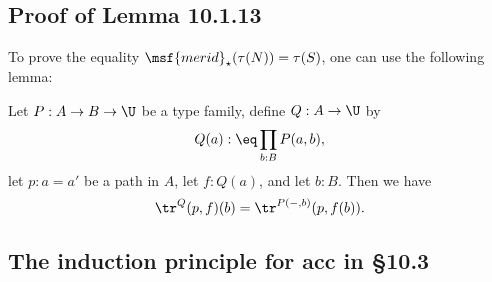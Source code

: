 \documentclass[12pt]{article}
\begin{document}
\begin{comment}

This is about the sentence ``The obvious candidate for the coequalizer of the kernel pair of $f:A\to B$ is the image of f, as defined in \S7.6'' a few paragraphs before Lemma 10.1.1. (It's clear from the context that $A$ and $B$ are sets.) Let's show that this obvious candidate is the good one. It suffices to prove the statement

Let $A$ and $B$ be sets, let $f:A\to B$ be a surjection, define the equivalence relation $\sim$ on $A$ by 
$$
a\sim a'\text{ if and only if }f(a)=f(a'),
$$
let $A/\!\!\sim$ be the quotient as defined at the beginning of \S6.10, and let $q:A\to A/\!\!\sim$ be the canonical projection. Then there is a map $g:B\to A/\!\!\sim$ such that $g\ci f=q$:
$$
\xymatrix{
&A\ar[dl]_f\ar[dr]^q\\
B\ar[rr]_g&&A/\!\!\sim.
}
$$ 

Proof. Given $b:B$ we define the sets and maps 
$$
\xymatrix{
\fib_f(b)\ar[rr]^{\pr_1}\ar[d]_{\lv-\rv}\ar[dr]^{q_b}&&A\ar[d]^q\\ 
\lV\fib_f(b)\rV\ar[r]_h&\fib_f(b)/\!\!\sim_b\ar[r]_{\ \ k}&A/\!\!\sim
}
$$ 
as follows: Let $\sim_b$ be the equivalence relation defined on $\fib_f(b)$ by the requirement that $x\sim_b y$ for all $x,y:\fib_f(b)$, and $q_b$ the canonical projection; and note that $q_b$ induces $h$ and that $q\ci\pr_1$ induces $k$. The above diagram having been constructed, we set $g(b):\eq k(h(x))$, with $x:\lV\fib_f(b)\rV$. The equality $g\ci f=q$ is easily checked. $\square$

\end{comment}


\subsection{Proof of Lemma 10.1.13}

To prove the equality $\msf{merid}_\star(\tau(N))=\tau(S)$, one can use the following lemma:

Let $P:A\to B\to\U$ be a type family, define $Q:A\to\U$ by $$Q(a):\eq\prod_{b:B}P(a,b),$$ let $p:a=a'$ be a path in $A$, let $f:Q(a)$, and let $b:B$. Then we have 
$$
\tr^Q(p,f)(b)=\tr^{P(-,b)}(p,f(b)).
$$


\subsection{The induction principle for \textsf{acc} in \S10.3}
\end{document}
